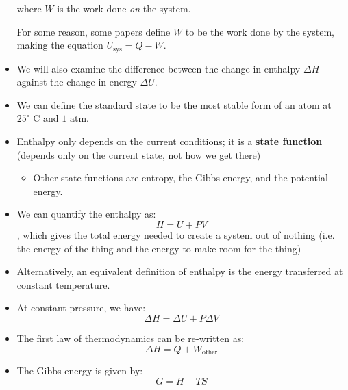 \begin{itemize}
    where $W$ is the work done \textit{on} the system.
    \begin{warning}
        For some reason, some papers define $W$ to be the work done by the system, making the equation $U_\text{sys} = Q - W$.
    \end{warning}
    \item We will also examine the difference between the change in enthalpy $\Delta H$ against the change in energy $\Delta U$.
    \item We can define the standard state to be the most stable form of an atom at $25^\circ \text{ C}$ and $1\text{ atm}$.
    \item Enthalpy only depends on the current conditions; it is a \textbf{state function} (depends only on the current state, not how we get there)
    \begin{itemize}
        \item Other state functions are entropy, the Gibbs energy, and the potential energy.
    \end{itemize}
    \item We can quantify the enthalpy as: \begin{equation}H = U + PV\end{equation}, which gives the total energy needed to create a system out of nothing (i.e. the energy of the thing and the energy to make room for the thing)
    \item Alternatively, an equivalent definition of enthalpy is the energy transferred at constant temperature.
    \item At constant pressure, we have:
    \begin{equation}
        \Delta H = \Delta U + P\Delta V
    \end{equation}
    \item The first law of thermodynamics can be re-written as:
    \begin{equation}
        \Delta H = Q + W_\text{other}
    \end{equation}
    \item The Gibbs energy is given by:
    \begin{equation}
        G = H - TS

\end{equation}
\end{itemize}
